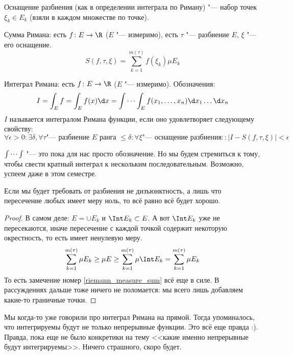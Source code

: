 \begin{Def}
	Оснащение разбиения (как в определении интеграла по Риману) "--- набор точек $\xi_k \in E_k$
	(взяли в каждом множестве по точке).
\end{Def}
\begin{Def}
	Сумма Римана: есть $f\colon E \to \R$ ($E$ "--- измеримо),
	есть $\tau$ "--- разбиение $E$, $\xi$ "--- его оснащение.
	\[
		S(f, \tau, \xi) = \sum_{k=1}^{m(\tau)} f(\xi_k) \mu E_k
	\]
\end{Def}
\begin{Def}
	Интеграл Римана: есть $f \colon E \to \R$ ($E$ "--- измеримо).
	Обозначения:
	\[
		I = \int_E f = \int_E f(x) \d x = \idotsint_E f(x_1, \dots, x_n) \d x_1 \dots \d x_n
	\]
	$I$ называется интегралом Римана функции, если оно удовлетворяет следующему свойству:
	\[
		\forall \epsilon > 0 \colon \exists \delta,
		\forall \tau \text{"--- разбиение $E$ ранга $\le \delta$} \colon
		\forall \xi \text{"--- оснащение разбиения} \colon
		\colon |I-S(f,\tau,\xi)| < \epsilon
	\]
\end{Def}
\begin{Rem}
	$\idotsint$ "--- это пока для нас просто обозначение.
	Но мы будем стремиться к тому, чтобы свести кратный интеграл к нескольким последовательным.
	Возможно, успеем даже в этом семестре.
\end{Rem}
\begin{Rem}
	Если мы будет требовать от разбиения не дизъюнктность, а лишь что пересечение любых имеет меру ноль,
	то всё равно всё будет хорошо.
\end{Rem}
\begin{proof}
	В самом деле: $E = \cup E_k$ и $\Int E_k \subset E$.
	А вот $\Int E_k$ уже не пересекаются, иначе пересечение с каждой точкой содержит некоторую окрестность,
	то есть имеет ненулевую меру.
	\[
	\sum_{k=1}^{m(\tau)} \mu E_k
	\ge \mu E \ge
	\sum_{k=1}^{m(\tau)} \mu \Int E_k
	= \sum_{k=1}^{m(\tau)} \mu E_k
	\]
	То есть замечение номер \ref{riemann_measure_sum} всё еще в силе.
	В рассуждениях дальше тоже ничего не поломается: мы всего лишь добавляем какие-то граничные точки.
\end{proof}
\begin{Rem}
	Мы когда-то уже говорили про интеграл Римана на прямой.
	Тогда упоминалось, что интегрируемы будут не только непрерывные функции.
	Это всё еще правда :).
	Правда, пока еще не было конкретики на тему <<какие именно непрерывные будут интегрируемы>>.
	Ничего страшного, скоро будет.
\end{Rem}

